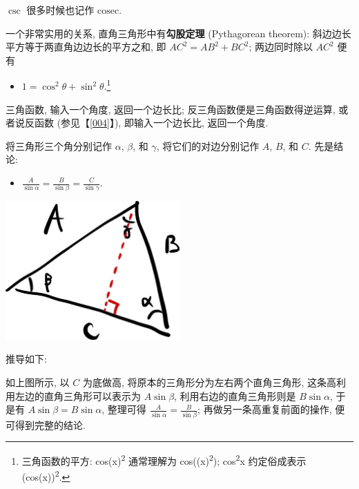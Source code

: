 \begin{tcolorbox}[size=fbox, breakable, enhanced jigsaw, title={三角函数
(trigonometry)}]
$\csc$ 很多时候也记作 $\text{cosec}$.

一个非常实用的关系, 直角三角形中有\textbf{勾股定理} (Pythagorean
theorem): 斜边边长平方等于两直角边边长的平方之和, 即 $AC^2=AB^2+BC^2$;
两边同时除以 $AC^2$ 便有

\begin{itemize}

\item
  $\boxed{1=\cos^2\theta+\sin^2\theta}$.\footnote{三角函数的平方:
    cos(x)\textsuperscript{2} 通常理解为 cos((x)\textsuperscript{2});
    cos\textsuperscript{2}x 约定俗成表示 (cos(x))\textsuperscript{2}.}
\end{itemize}

\end{tcolorbox}

\begin{tcolorbox}[size=fbox, breakable, enhanced jigsaw, title={反三角函数}]

三角函数, 输入一个角度, 返回一个边长比; 反三角函数便是三角函数得逆运算,
或者说反函数 (参见【\ref{004}】), 即输入一个边长比, 返回一个角度.

\end{tcolorbox}

\begin{tcolorbox}[size=fbox, breakable, enhanced jigsaw, title={正弦定律 (law of sine)}]

将三角形三个角分别记作 $\alpha$, $\beta$, 和 $\gamma$,
将它们的对边分别记作 $A$, $B$, 和 $C$. 先是结论:

\begin{itemize}

\item
  $\boxed{\frac{A}{\sin\alpha}=\frac{B}{\sin\beta}=\frac{C}{\sin\gamma}}$.
\end{itemize}

\begin{tcolorbox}[size=fbox, breakable, enhanced jigsaw]
\includegraphics[width=0.5\textwidth]{img/image-20230308142913522.png}
\end{tcolorbox}

推导如下:

如上图所示, 以 $C$ 为底做高, 将原本的三角形分为左右两个直角三角形,
这条高利用左边的直角三角形可以表示为 $A\sin\beta$,
利用右边的直角三角形则是 $B\sin\alpha$, 于是有
$A\sin\beta=B\sin\alpha$, 整理可得
$\frac{A}{\sin\alpha}=\frac{B}{\sin\beta}$;
再做另一条高重复前面的操作, 便可得到完整的结论.

\end{tcolorbox}


